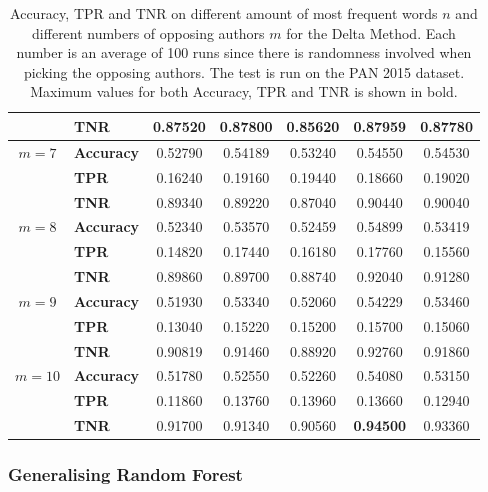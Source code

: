 \begin{table}
\begin{tabular}{c|lccccc}
               & \textbf{TNR}      & 0.87520 & 0.87800 & 0.85620 & 0.87959 & 0.87780 \\
        \hline
        $m=7$  & \textbf{Accuracy} & 0.52790 & 0.54189 & 0.53240 & 0.54550 & 0.54530 \\
               & \textbf{TPR}      & 0.16240 & 0.19160 & 0.19440 & 0.18660 & 0.19020 \\
               & \textbf{TNR}      & 0.89340 & 0.89220 & 0.87040 & 0.90440 & 0.90040 \\
        \hline
        $m=8$  & \textbf{Accuracy} & 0.52340 & 0.53570 & 0.52459 & 0.54899 & 0.53419 \\
               & \textbf{TPR}      & 0.14820 & 0.17440 & 0.16180 & 0.17760 & 0.15560 \\
               & \textbf{TNR}      & 0.89860 & 0.89700 & 0.88740 & 0.92040 & 0.91280 \\
        \hline
        $m=9$  & \textbf{Accuracy} & 0.51930 & 0.53340 & 0.52060 & 0.54229 & 0.53460 \\
               & \textbf{TPR}      & 0.13040 & 0.15220 & 0.15200 & 0.15700 & 0.15060 \\
               & \textbf{TNR}      & 0.90819 & 0.91460 & 0.88920 & 0.92760 & 0.91860 \\
        \hline
        $m=10$ & \textbf{Accuracy} & 0.51780 & 0.52550 & 0.52260 & 0.54080 & 0.53150 \\
               & \textbf{TPR}      & 0.11860 & 0.13760 & 0.13960 & 0.13660 & 0.12940 \\
               & \textbf{TNR}      & 0.91700 & 0.91340 & 0.90560 & \textbf{0.94500} & 0.93360
    \end{tabular}
    \caption{Accuracy, \gls{TPR} and \gls{TNR} on different amount of most
        frequent words $n$ and different numbers of opposing authors $m$ for the
        Delta Method. Each number is an average of 100 runs since there is
        randomness involved when picking the opposing authors. The test is run
        on the PAN 2015 dataset. Maximum values for both Accuracy, \gls{TPR} and
        \gls{TNR} is shown in bold.}
    \label{fig:delta_pan_2015_res}
\end{table}

\subsubsection{Generalising Random Forest} \label{subsubsec:method:generalising_random_forest}

